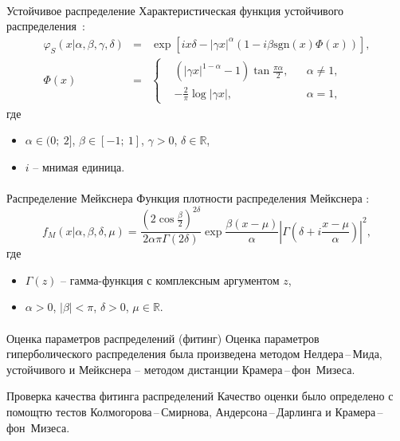 \documentclass[aspectratio=169]{beamer}
\begin{document}
\begin{frame}{\insertsection}
    \framesubtitle{\insertsubsection}
    \begin{block}{Устойчивое распределение}
    Характеристическая функция устойчивого распределения~\cite{Nolan2009}:
    \begin{eqnarray}
        \varphi_S(x|\alpha,\beta,\gamma,\delta) &=& \exp{\left[ix\delta-|\gamma x|^\alpha \left(1 - i\beta\text{sgn}(x)\Phi(x)\right)\right]}, \\
        \Phi(x) &=& \left\{ \begin{aligned}
            & \left(|\gamma x|^{1-\alpha} - 1\right)\tan{\frac{\pi\alpha}{2}}, & & \alpha \ne 1, \\
            & -\frac{2}{\pi}\log{|\gamma x|}, & & \alpha = 1,
        \end{aligned} \right. \nonumber
    \end{eqnarray}
    где
    \begin{itemize}
        \item $\alpha \in (0;\ 2]$, $\beta \in [-1;\ 1]$, $\gamma > 0$, $\delta \in \mathbb{R}$, 
        \item $i$ -- мнимая единица.
    \end{itemize}
    \end{block}
\end{frame}

\begin{frame}{\insertsection}
    \framesubtitle{\insertsubsection}
    \begin{block}{Распределение Мейкснера}
    Функция плотности распределения Мейкснера \cite{Schoutens2002}:
    \begin{equation}
        f_M(x|\alpha,\beta,\delta,\mu) = \frac{ \left( 2 \cos{ \frac{\beta}{2}} \right)^{2 \delta}}{2 \alpha \pi \Gamma(2 \delta)} \exp{\frac{\beta(x - \mu)}{\alpha}} \left| \Gamma \left( \delta + i \frac{x - \mu}{\alpha} \right) \right|^2,
    \end{equation}
    где
    \begin{itemize}
        \item $\Gamma(z)$ -- гамма-функция с комплексным аргументом $z$, 
        \item $\alpha > 0$, $|\beta| < \pi$, $\delta > 0$, $\mu \in \mathbb{R}$.
    \end{itemize}
    \end{block}
\end{frame}

\begin{frame}{\insertsection}
    \framesubtitle{\insertsubsection}
    \begin{block}{Оценка параметров распределений (фитинг)}
        Оценка параметров гиперболического распределения была произведена методом Нелдера\,--\,Мида, устойчивого и Мейкснера -- методом дистанции Крамера\,--\,фон~Мизеса.
    \end{block}
    \begin{block}{Проверка качества фитинга распределений}
        Качество оценки было определено с помощтю тестов Колмогорова\,--\,Смирнова, Андерсона\,--\,Дарлинга и Крамера\,--\,фон~Мизеса.
    \end{block}
\end{frame}
\end{document}
